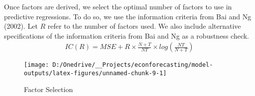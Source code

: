\documentclass[11pt, letterpaper]{article}\usepackage[]{graphicx}\usepackage[]{color}
\begin{document}
Once factors are derived, we select the optimal number of factors to use in predictive regressions. To do so, we use the information criteria from Bai and Ng (2002). Let $R$ refer to the number of factors used. We also include alternative specifications of the information criteria from Bai and Ng as a robustness check.
\begin{align*}
	IC(R) = MSE + R \times \frac{N+T}{NT} \times log\left(\frac{NT}{N+T}\right)
\end{align*}

\begin{figure}[H]

{\centering \texttt{[image: D:/Onedrive/\_\_Projects/econforecasting/model-outputs/latex-figures/unnamed-chunk-9-1]} 

}

\caption[Factor Selection]{Factor Selection}\label{fig:unnamed-chunk-9}
\end{figure}
\end{document}
